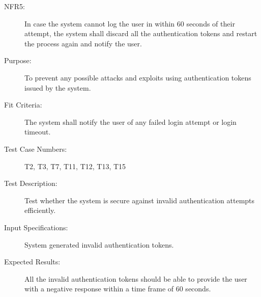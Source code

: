 \documentclass[a4paper,twoside,phd]{BYUPhys}
\begin{document}
\begin{description}
\item[NFR5:] In case the system cannot log the user in within 60 seconds of their attempt, the system shall discard all the authentication tokens and restart the process again and notify the user.
\item[Purpose:] To prevent any possible attacks and exploits using authentication tokens issued by the system.
\item[Fit Criteria:] The system shall notify the user of any failed login attempt or login timeout.
\item[Test Case Numbers:] T2, T3, T7, T11, T12, T13, T15
\item[Test Description:] Test whether the system is secure against invalid authentication attempts efficiently.
\item[Input Specifications:] System generated invalid authentication tokens. 
\item[Expected Results:] All the invalid authentication tokens should be able to provide the user with a negative response within a time frame of 60 seconds.

\end{description}
\end{document}
